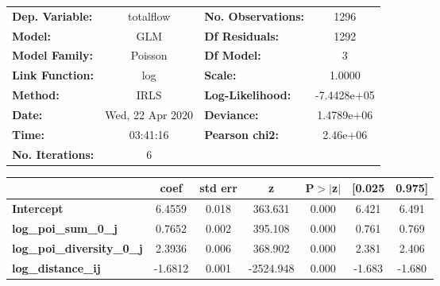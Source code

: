\begin{center}
\begin{tabular}{lclc}
\toprule
\textbf{Dep. Variable:}            &    totalflow     & \textbf{  No. Observations:  } &      1296    \\
\textbf{Model:}                    &       GLM        & \textbf{  Df Residuals:      } &      1292    \\
\textbf{Model Family:}             &     Poisson      & \textbf{  Df Model:          } &         3    \\
\textbf{Link Function:}            &       log        & \textbf{  Scale:             } &     1.0000   \\
\textbf{Method:}                   &       IRLS       & \textbf{  Log-Likelihood:    } & -7.4428e+05  \\
\textbf{Date:}                     & Wed, 22 Apr 2020 & \textbf{  Deviance:          } &  1.4789e+06  \\
\textbf{Time:}                     &     03:41:16     & \textbf{  Pearson chi2:      } &   2.46e+06   \\
\textbf{No. Iterations:}           &        6         & \textbf{                     } &              \\
\bottomrule
\end{tabular}
\begin{tabular}{lcccccc}
                                   & \textbf{coef} & \textbf{std err} & \textbf{z} & \textbf{P$> |$z$|$} & \textbf{[0.025} & \textbf{0.975]}  \\
\midrule
\textbf{Intercept}                 &       6.4559  &        0.018     &   363.631  &         0.000        &        6.421    &        6.491     \\
\textbf{log\_poi\_sum\_0\_j}       &       0.7652  &        0.002     &   395.108  &         0.000        &        0.761    &        0.769     \\
\textbf{log\_poi\_diversity\_0\_j} &       2.3936  &        0.006     &   368.902  &         0.000        &        2.381    &        2.406     \\
\textbf{log\_distance\_ij}         &      -1.6812  &        0.001     & -2524.948  &         0.000        &       -1.683    &       -1.680     \\
\bottomrule
\end{tabular}
\end{center}